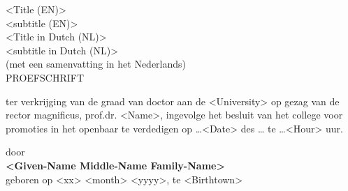 \thispagestyle{titlepage}

\begin{centering}
\Huge <Title (EN)>\\[0.5em]
\Large <subtitle (EN)>\\[2.5em]
\LARGE <Title in Dutch (NL)>\\[0.5em]
\large <subtitle in Dutch (NL)>\\[1em]
\large(met een samenvatting in het Nederlands)\\[2.5em]
\Large PROEFSCHRIFT\\[2.5em]
\end{centering}

\large{ter verkrijging van de graad van doctor aan de <University>
op gezag van de rector magnificus, prof.dr. <Name>, 
ingevolge het besluit van het college voor promoties
in het openbaar te verdedigen
op \ldots<Date> des \ldots <Part of day> te \ldots <Hour> uur.\\[2.5em]}

\begin{centering}


door\\[2.5em]
\Large{\textbf{<Given-Name Middle-Name Family-Name>}}\\[1em]
geboren op <xx> <month> <yyyy>, te <Birthtown>

\end{centering}
